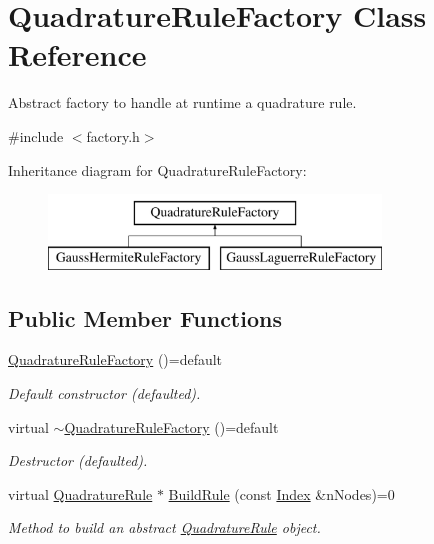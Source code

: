 \hypertarget{classQuadratureRuleFactory}{\section{Quadrature\-Rule\-Factory Class Reference}
\label{classQuadratureRuleFactory}
}


Abstract factory to handle at runtime a quadrature rule.  




{\ttfamily \#include $<$factory.\-h$>$}

Inheritance diagram for Quadrature\-Rule\-Factory\-:\begin{figure}[H]
\begin{center}
\leavevmode
\includegraphics[height=2.000000cm]{classQuadratureRuleFactory}
\end{center}
\end{figure}
\subsection*{Public Member Functions}
\begin{DoxyCompactItemize}
\item 
\hypertarget{classQuadratureRuleFactory_a2c094b9c41d5a88ae4e8e4ef1f665cf8}{\hyperlink{classQuadratureRuleFactory_a2c094b9c41d5a88ae4e8e4ef1f665cf8}{Quadrature\-Rule\-Factory} ()=default}\label{classQuadratureRuleFactory_a2c094b9c41d5a88ae4e8e4ef1f665cf8}

\begin{DoxyCompactList}\small\item\em Default constructor (defaulted). \end{DoxyCompactList}\item 
\hypertarget{classQuadratureRuleFactory_a0744c125ab0b59fb96f8d9d33491d594}{virtual \hyperlink{classQuadratureRuleFactory_a0744c125ab0b59fb96f8d9d33491d594}{$\sim$\-Quadrature\-Rule\-Factory} ()=default}\label{classQuadratureRuleFactory_a0744c125ab0b59fb96f8d9d33491d594}

\begin{DoxyCompactList}\small\item\em Destructor (defaulted). \end{DoxyCompactList}\item 
virtual \hyperlink{classQuadratureRule}{Quadrature\-Rule} $\ast$ \hyperlink{classQuadratureRuleFactory_adc9f82328b7cba8517e462e99c58335e}{Build\-Rule} (const \hyperlink{typedefs_8h_a2c726f8f32697958e9d6c2afecda531d}{Index} \&n\-Nodes)=0
\begin{DoxyCompactList}\small\item\em Method to build an abstract \hyperlink{classQuadratureRule}{Quadrature\-Rule} object. \end{DoxyCompactList}\end{DoxyCompactItemize}



